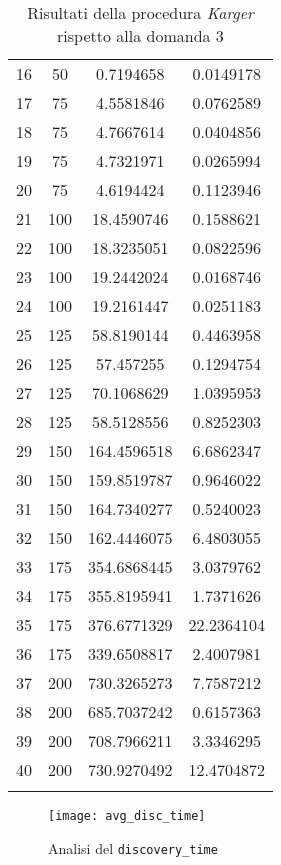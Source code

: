 \begin{center}
\begin{longtable}{|c|c|c|c|}
		16 & 50 & 0.7194658 & 0.0149178 \\	        
		17 & 75 & 4.5581846 & 0.0762589 \\	   		
		18 & 75 & 4.7667614 & 0.0404856 \\	  		
		19 & 75 & 4.7321971 & 0.0265994 \\	   		
		20 & 75 & 4.6194424 & 0.1123946 \\		  	
		21 & 100 & 18.4590746 & 0.1588621 \\	 
		22 & 100 & 18.3235051 & 0.0822596 \\	 
		23 & 100 & 19.2442024 & 0.0168746 \\		 
		24 & 100 & 19.2161447 & 0.0251183 \\		 
		25 & 125 & 58.8190144 & 0.4463958 \\	  
		26 & 125 & 57.457255 & 0.1294754 \\		
		27 & 125 & 70.1068629 & 1.0395953 \\		 
		28 & 125 & 58.5128556 & 0.8252303 \\		 
		29 & 150 & 164.4596518 & 6.6862347 \\	  
		30 & 150 & 159.8519787 & 0.9646022 \\	    
		31 & 150 & 164.7340277 & 0.5240023 \\		 
		32 & 150 & 162.4446075 & 6.4803055 \\		 
		33 & 175 & 354.6868445 & 3.0379762 \\		 
		34 & 175 & 355.8195941 & 1.7371626 \\	   	
		35 & 175 & 376.6771329 & 22.2364104 \\	  	 
		36 & 175 & 339.6508817 & 2.4007981 \\	 
		37 & 200 & 730.3265273 & 7.7587212 \\		 
		38 & 200 & 685.7037242 & 0.6157363 \\	  
		39 & 200 & 708.7966211 & 3.3346295 \\	  
		40 & 200 & 730.9270492 & 12.4704872 \\	
		\hline
		\caption{Risultati della procedura \textit{Karger} rispetto alla domanda 3}
		\label{dt-results}
	\end{longtable}
\end{center}\vspace{-40pt}

\begin{figure}[H]
	\centering
	\texttt{[image: avg\_disc\_time]}
	\caption{Analisi del \texttt{discovery\_time}}
	\label{dt-confronto}
\end{figure}

